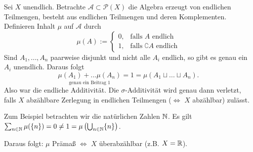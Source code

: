 \begin{example}
Sei $X$ unendlich. Betrachte $\mathcal{A} \subset \mathcal{P}(X)$ die Algebra erzeugt von endlichen Teilmengen, besteht aus endlichen Teilmengen und deren Komplementen. Definieren Inhalt $\mu$ auf $\mathcal{A}$ durch
$$ \mu (A) := \begin{cases}
	0, & \text{falls } A \text{ endlich} \\
	1, & \text{falls } \complement A \text{ endlich}
	\end{cases}$$
Sind $A_1,...,A_n$ paarweise disjunkt und nicht alle $A_i$ endlich, so gibt es genau ein $A_i$ unendlich. Daraus folgt
$$\underset{\text{genau ein Beitrag }1}{\mu(A_1)+...\mu(A_n)} = 1 = \mu(A_1 \sqcup ... \sqcup A_n).$$
Also war die endliche Additivität. Die $\sigma$-Additivität wird genau dann verletzt, falls $X$ abzählbare Zerlegung in endlichen Teilmengen ($\iff$ $X$ abzählbar) zulässt. \begin{small}Zum Beispiel betrachten wir die natürlichen Zahlen $\mathbb{N}$. Es gilt $\sum_{n\in \mathbb{N}} \mu (\{n\}) =0 \neq 1 = \mu \left( \bigcup_{n \in \mathbb{N}} \{n\} \right)$.
\end{small} Daraus folgt: $\mu $ Prämaß $\iff$ $X$ überabzählbar (z.B. $X = \mathbb{R}$).
\end{example}

